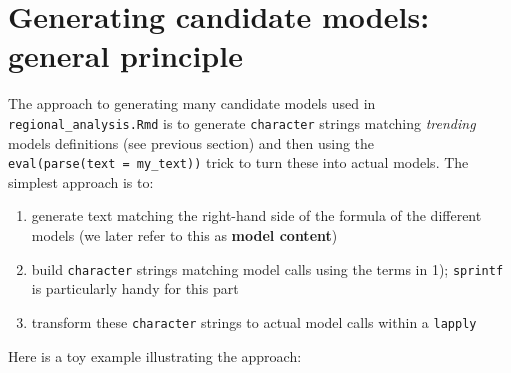\documentclass[]{book}
\newenvironment{Shaded}{\begin{snugshade}}{\end{snugshade}}
\newcommand{\CommentTok}[1]{\textcolor[rgb]{0.56,0.35,0.01}{\textit{#1}}}
\newcommand{\ControlFlowTok}[1]{\textcolor[rgb]{0.13,0.29,0.53}{\textbf{#1}}}
\newcommand{\DataTypeTok}[1]{\textcolor[rgb]{0.13,0.29,0.53}{#1}}
\newcommand{\KeywordTok}[1]{\textcolor[rgb]{0.13,0.29,0.53}{\textbf{#1}}}
\newcommand{\NormalTok}[1]{#1}
\newcommand{\StringTok}[1]{\textcolor[rgb]{0.31,0.60,0.02}{#1}}
\begin{document}
\hypertarget{generating-candidate-models-general-principle}{%
\section{Generating candidate models: general principle}\label{generating-candidate-models-general-principle}}

The approach to generating many candidate models used in \texttt{regional\_analysis.Rmd}
is to generate \texttt{character} strings matching \emph{trending} models definitions (see
previous section) and then using the \texttt{eval(parse(text\ =\ my\_text))} trick to turn
these into actual models. The simplest approach is to:

\begin{enumerate}
\def\labelenumi{\arabic{enumi}.}
\item
  generate text matching the right-hand side of the formula of the different
  models (we later refer to this as \textbf{model content})
\item
  build \texttt{character} strings matching model calls using the terms in 1); \texttt{sprintf}
  is particularly handy for this part
\item
  transform these \texttt{character} strings to actual model calls within a \texttt{lapply}
\end{enumerate}

Here is a toy example illustrating the approach:

\begin{Shaded}
\end{Shaded}
\end{document}
